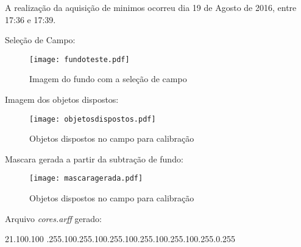 	
A realização da aquisição de minimos ocorreu dia 19 de Agosto de 2016, entre 17:36 e 17:39.

Seleção de Campo:
\begin{figure}[H]
		\centering
		\texttt{[image: fundoteste.pdf]}
		\caption{Imagem do fundo com a seleção de campo}
		\label{disposicaoparte}
	\end{figure}
	
Imagem dos objetos dispostos:
	\begin{figure}[H]
		\centering
		\texttt{[image: objetosdispostos.pdf]}
		\caption{Objetos dispostos no campo para calibração}
		\label{disposicaoparte}
	\end{figure}
	
Mascara gerada a partir da subtração de fundo:
	\begin{figure}[H]
		\centering
		\texttt{[image: mascaragerada.pdf]}
		\caption{Objetos dispostos no campo para calibração}
		\label{disposicaoparte}
	\end{figure}
	
Arquivo \textit{cores.arff} gerado:
\begin{center}
21.100.100 .255.100.255.100.255.100.255.100.255.100.255.0.255\newline

\end{center}

	